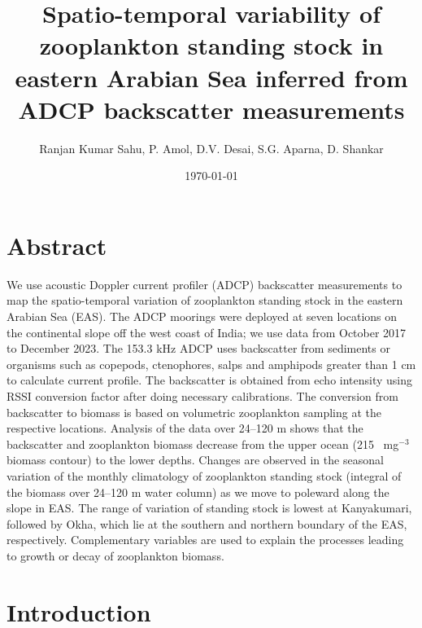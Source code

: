 \documentclass{article}
\title{Spatio-temporal variability of zooplankton standing stock in eastern Arabian Sea inferred from ADCP backscatter measurements }}
\author{Ranjan Kumar Sahu, P. Amol, D.V. Desai, S.G. Aparna,  D. Shankar}
\date{\today}
\begin{document}
	

	\maketitle
	\linenumbers
	\section*{Abstract}
	
We use acoustic Doppler current profiler (ADCP) backscatter measurements to map
the spatio-temporal variation of zooplankton standing stock in the eastern Arabian Sea (EAS). The ADCP moorings were deployed at seven locations on the continental slope off the west coast of India; we use data from October 2017 to December 2023. The 153.3 kHz ADCP uses backscatter from sediments or organisms such as copepods, ctenophores, salps and amphipods greater than 1 cm to calculate current profile. The backscatter is obtained from echo intensity using RSSI conversion factor after doing necessary calibrations. The conversion from backscatter to biomass is based on volumetric zooplankton sampling at the respective locations. Analysis of the data over 24--120 m shows that the backscatter and zooplankton biomass decrease from the upper ocean (215 ~mg$^{-3}$ biomass contour) to the lower depths. Changes are observed in the seasonal variation of the monthly climatology of zooplankton standing stock (integral of the biomass over 24--120 m water
column) as we move to poleward along the slope in EAS. The range of variation of standing stock is lowest at Kanyakumari, followed by Okha, which lie at the southern and northern boundary of the EAS, respectively. Complementary variables are used to explain the processes leading to growth or decay of zooplankton biomass.	
	\newpage
	\section{Introduction}
\end{document}

